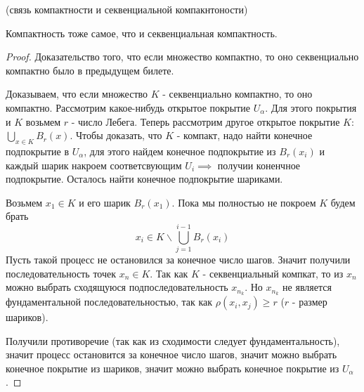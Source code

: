 \begin{theorem} (связь компактности и секвенциальной компакнтоности) \thmslashn

  Компактность тоже самое, что и секвенциальная компактность.
  \begin{proof} \thmslashn

    Доказательство того, что если множество компактно, то оно секвенциально компактно было в предыдущем билете. \par
    Доказываем, что если множество $K$ - секвенциально компактно, то оно компактно. Рассмотрим какое-нибудь открытое покрытие $U_{\alpha}$. Для этого покрытия и $K$ возьмем $r$ - число Лебега.
  Теперь рассмотрим другое открытое покрытие $K$: $\bigcup\limits_{x\in K}{B_r(x)}$. Чтобы доказать, что $K$ - компакт, надо найти конечное подпокрытие в $U_{\alpha}$, для этого найдем конечное подпокрытие из $B_r(x_i)$ и каждый шарик накроем соответсвующим $U_i \implies$ получии коненчное подпокрытие. Осталось найти конечное подпокрытие шариками. 
  \par
  Возьмем $x_1 \in K$ и его шарик $B_r(x_1)$. Пока мы полностью не покроем $K$ будем брать \[x_i \in K\backslash\bigcup\limits_{j = 1}^{i-1}B_r(x_i)\]
  Пусть такой процесс не остановился за конечное число шагов. Значит получили последовательность точек ${x_n} \in K$. Так как $K$ - секвенциальный компкат, то из $x_{n}$ можно выбрать сходящуюся  подпоследовательность $x_{n_k}$. Но $x_{n_k}$ не является фундаментальной последовательностью, так как $\rho(x_i, x_j) \ge r$ ($r$ - размер шариков). \par
  Получили противоречие (так как из сходимости следует фундаментальность), значит процесс остановится за конечное число шагов, значит можно выбрать конечное покрытие из шариков, значит можно выбрать конечное покрытие из $U_{\alpha}$.
  \end{proof}
\end{theorem}



